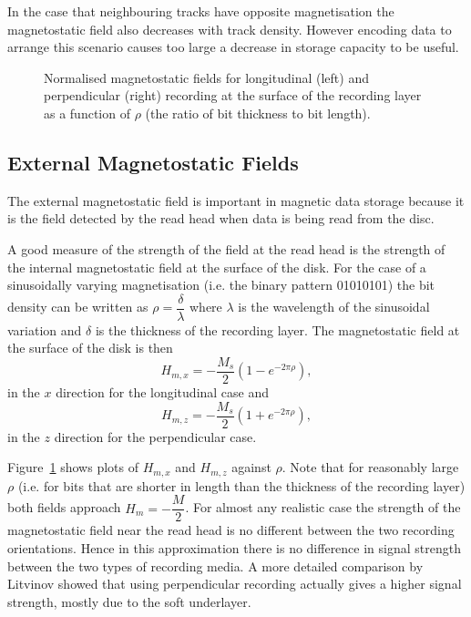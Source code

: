 In the case that neighbouring tracks have opposite magnetisation the
magnetostatic field also decreases with track density. However encoding data to
arrange this scenario causes too large a decrease in storage capacity to be
useful. \cite{Litvinov2002}

\begin{figure}
  \begin{center}
    \hspace{-5em} %
     
    \caption{Normalised magnetostatic fields for longitudinal (left) and perpendicular (right) recording at the surface of the recording layer as a function of $\rho$ (the ratio of bit thickness to bit length).}
    \label{fig:surface-demag}
  \end{center}
\end{figure}

\subsection{External Magnetostatic Fields}
\label{sec:Stray-fields}

The external magnetostatic field is important in magnetic data storage because
it is the field detected by the read head when data is being read from the
disc. \cite{Richter1999}

A good measure of the strength of the field at the read head is the strength of
the internal magnetostatic field at the surface of the disk. For the case of a
sinusoidally varying magnetisation (i.e. the binary pattern 01010101) the bit
density can be written as $\rho=\dfrac{\delta}{\lambda}$ where $\lambda$ is the
wavelength of the sinusoidal variation and $\delta$ is the thickness of the recording
layer. The magnetostatic field at the surface of the disk is then
\[ H_{m,x}=-\frac{M_s}{2}(1-e^{-2\pi\rho}),\]
in the $x$ direction for the longitudinal case and
\[ H_{m,z}=-\frac{M_s}{2}(1+e^{-2\pi\rho}),\]
in the $z$ direction for the perpendicular case. \cite{Richter1999}


Figure~\ref{fig:surface-demag} shows plots of $H_{m,x}$ and $H_{m,z}$ against
$\rho$. Note that for reasonably large $\rho$ (i.e. for bits that are shorter in
length than the thickness of the recording layer) both fields approach
$H_{m}=-\dfrac{M}{2}$. For almost any realistic case the strength of the
magnetostatic field near the read head is no different between the two recording
orientations. Hence in this approximation there is no difference in signal
strength between the two types of recording media. A more detailed comparison by
Litvinov \cite{Litvinov2005a} showed that using perpendicular recording actually
gives a higher signal strength, mostly due to the soft underlayer.


